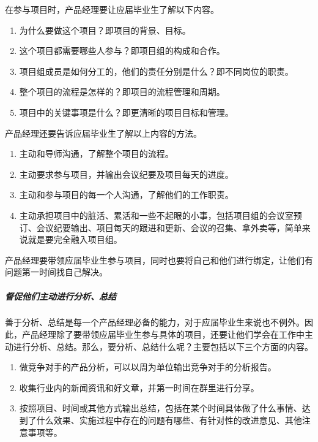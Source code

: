 \documentclass[letterpaper,11pt,english]{sphinxmanual}
\begin{document}
在参与项目时，产品经理要让应届毕业生了解以下内容。
\begin{enumerate}
%
\item {} 
为什么要做这个项目？即项目的背景、目标。

\item {} 
这个项目都需要哪些人参与？即项目组的构成和合作。

\item {} 
项目组成员是如何分工的，他们的责任分别是什么？即不同岗位的职责。

\item {} 
整个项目的流程是怎样的？即项目的流程管理和周期。

\item {} 
项目中的关键事项是什么？即更清晰的项目目标和管理。

\end{enumerate}

产品经理还要告诉应届毕业生了解以上内容的方法。
\begin{enumerate}
%
\item {} 
主动和导师沟通，了解整个项目的流程。

\item {} 
主动要求参与项目，并输出会议纪要及项目每天的进度。

\item {} 
主动和参与项目的每一个人沟通，了解他们的工作职责。

\item {} 
主动承担项目中的脏活、累活和一些不起眼的小事，包括项目组的会议室预订、会议纪要输出、项目每天的跟进和更新、会议的召集、拿外卖等，简单来说就是要完全融入项目组。

\end{enumerate}

产品经理要带领应届毕业生参与项目，同时也要将自己和他们进行绑定，让他们有问题第一时间找自己解决。


\subparagraph{督促他们主动进行分析、总结}
\label{\detokenize{chapter_AI_dive/develop:id8}}
善于分析、总结是每一个产品经理必备的能力，对于应届毕业生来说也不例外。因此，产品经理除了要带领应届毕业生参与具体的项目，还要让他们学会在工作中主动进行分析、总结。那么，要分析、总结什么呢？主要包括以下三个方面的内容。
\begin{enumerate}
%
\item {} 
做竞争对手的产品分析，可以以周为单位输出竞争对手的分析报告。

\item {} 
收集行业内的新闻资讯和好文章，并第一时间在群里进行分享。

\item {} 
按照项目、时间或其他方式输出总结，包括在某个时间具体做了什么事情、达到了什么效果、实施过程中存在的问题有哪些、有针对性的改进意见、其他注意事项等。

\end{enumerate}
\end{document}
